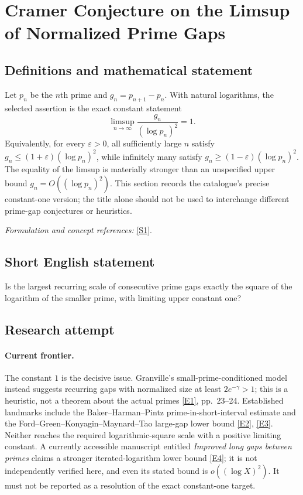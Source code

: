 \documentclass[11pt,a4paper]{article}
\newcommand{\eps}{\varepsilon}
\newcommand{\sref}[2]{\hyperlink{source:#1:#2}{[S#2]}}
\newcommand{\eref}[2]{\hyperlink{extra:#1:#2}{[E#2]}}
\newif\ifshowcatalogue
\newcommand{\cataloguescope}[1]{\ifshowcatalogue
 \paragraph{Exact scope in the supplied catalogue.}
 \begin{quote}\small #1\end{quote}\fi}
\numberwithin{equation}{section}
\begin{document}
\setcounter{section}{0}
\clearpage
\section*{\texorpdfstring{Cramer Conjecture on the Limsup of Normalized Prime Gaps}{Cramer Conjecture on the Limsup of Normalized Prime Gaps}}\label{30006761}
\subsection{Definitions and mathematical statement}
Let $p_n$ be the $n$th prime and $g_n=p_{n+1}-p_n$. With natural logarithms, the selected assertion is the exact constant statement
\[
 \limsup_{n\to\infty}\frac{g_n}{(\log p_n)^2}=1.
\]
Equivalently, for every $\eps>0$, all sufficiently large $n$ satisfy
$g_n\le(1+\eps)(\log p_n)^2$, while infinitely many satisfy
$g_n\ge(1-\eps)(\log p_n)^2$. The equality of the limsup is materially stronger than an unspecified upper bound $g_n=O((\log p_n)^2)$. This section records the catalogue's precise constant-one version; the title alone should not be used to interchange different prime-gap conjectures or heuristics.
\par\smallskip\textit{Formulation and concept references:} \sref{30006761}{1}.
\cataloguescope{Prove that lim sup\_\{n -> infinity\} (p\_\{n+1\} - p\_n) / (log p\_n)\textasciicircum{}2 = 1, where p\_n is the n-th prime.}
\subsection{Short English statement}
Is the largest recurring scale of consecutive prime gaps exactly the square of the logarithm of the smaller prime, with limiting upper constant one?
\subsection{Research attempt}

\paragraph{Current frontier.}
The constant $1$ is the decisive issue. Granville's small-prime-conditioned
model instead suggests recurring gaps with normalized size at least
$2e^{-\gamma}>1$; this is a heuristic, not a theorem about the actual
primes \eref{30006761}{1}, pp.~23--24. Established landmarks include the
Baker--Harman--Pintz prime-in-short-interval estimate and the
Ford--Green--Konyagin--Maynard--Tao large-gap lower bound
\eref{30006761}{2}, \eref{30006761}{3}. Neither reaches the required logarithmic-square
scale with a positive limiting constant. A currently accessible manuscript
entitled \emph{Improved long gaps between primes} claims a stronger
iterated-logarithm lower bound \eref{30006761}{4}; it is not independently
verified here, and even its stated bound is $o((\log X)^2)$. It must not be
reported as a resolution of the exact constant-one target.
\end{document}
